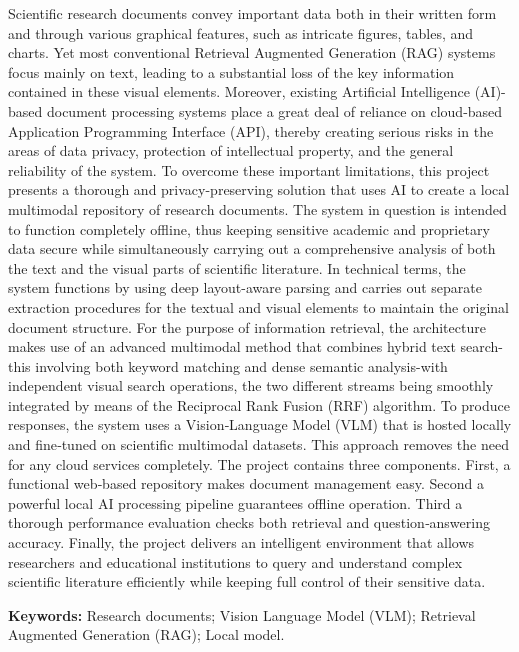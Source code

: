 \documentclass[11pt,a4paper]{report}
\begin{document}
Scientific research documents convey important data both in their written form and through various graphical features, such as intricate figures, tables, and charts. Yet most conventional Retrieval Augmented Generation (RAG) systems focus mainly on text, leading to a substantial loss of the key information contained in these visual elements. Moreover, existing Artificial Intelligence (AI)-based document processing systems place a great deal of reliance on cloud-based Application Programming Interface (API), thereby creating serious risks in the areas of data privacy, protection of intellectual property, and the general reliability of the system. To overcome these important limitations, this project presents a thorough and privacy-preserving solution that uses AI to create a local multimodal repository of research documents. The system in question is intended to function completely offline, thus keeping sensitive academic and proprietary data secure while simultaneously carrying out a comprehensive analysis of both the text and the visual parts of scientific literature. In technical terms, the system functions by using deep layout-aware parsing and carries out separate extraction procedures for the textual and visual elements to maintain the original document structure. For the purpose of information retrieval, the architecture makes use of an advanced multimodal method that combines hybrid text search-this involving both keyword matching and dense semantic analysis-with independent visual search operations, the two different streams being smoothly integrated by means of the Reciprocal Rank Fusion (RRF) algorithm. To produce responses, the system uses a Vision‑Language Model (VLM) that is hosted locally and fine‑tuned on scientific multimodal datasets. This approach removes the need for any cloud services completely. The project contains three components. First, a functional web‑based repository makes document management easy. Second a powerful local AI processing pipeline guarantees offline operation. Third a thorough performance evaluation checks both retrieval and question‑answering accuracy. Finally, the project delivers an intelligent environment that allows researchers and educational institutions to query and understand complex scientific literature efficiently while keeping full control of their sensitive data.


\vspace{4mm}
\noindent\textbf{Keywords:} Research documents; Vision Language Model (VLM); Retrieval Augmented Generation (RAG); Local model.
\end{document}
